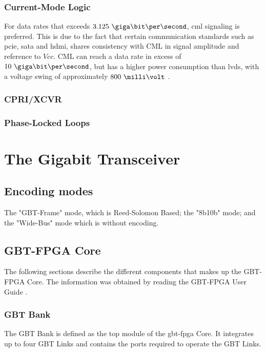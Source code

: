 \documentclass[main.tex]{subfiles}
\begin{document}
\subsection{Current-Mode Logic}

For data rates that exceeds $3.125\ \giga\bit\per\second$, \gls{cml} signaling is preferred. This is due to the fact that certain communication standards such as \acrshort{pcie}, \acrshort{sata} and \acrshort{hdmi}, shares consistency with CML in signal amplitude and reference to $Vcc$. CML can reach a data rate in excess of $10\ \giga\bit\per\second$, but has a higher power consumption than \gls{lvds}, with a voltage swing of approximately $800\ \milli\volt$ \cite{ti08lvds}.

\subsection{CPRI/XCVR}

\subsection{Phase-Locked Loops}


\chapter{The Gigabit Transceiver} \label{chap:gbt}

\section{Encoding modes}

The "GBT-Frame" mode, which is Reed-Solomon Based; the "8b10b" mode; and the "Wide-Bus" mode which is without encoding.

\section{GBT-FPGA Core}
The following sections describe the different components that makes up the GBT-FPGA Core. The information was obtained by reading the GBT-FPGA User Guide \cite{gbt_fpga}.

\subsection{GBT Bank}
The GBT Bank is defined as the top module of the \gls{gbt}-\gls{fpga} Core. It integrates up to four GBT Links and contains the ports required to operate the GBT Links.
\end{document}
